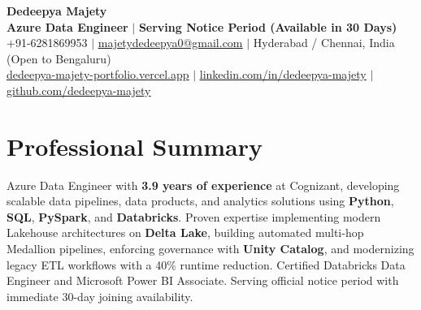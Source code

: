 \documentclass[letterpaper,10pt]{article}
\begin{document}
\begin{center}
    {\Huge \bfseries \color{primaryAccent} Dedeepya Majety} \\ \vspace{2pt}
    \textbf{Azure Data Engineer} $\vert$ \textbf{Serving Notice Period (Available in 30 Days)} \\ \vspace{2pt}
    \small +91-6281869953 $\vert$ \href{mailto:majetydedeepya0@gmail.com}{\underline{majetydedeepya0@gmail.com}} $\vert$ Hyderabad / Chennai, India (Open to Bengaluru) \\ \vspace{1.5pt}
    \href{https://dedeepya-majety-portfolio.vercel.app}{\underline{dedeepya-majety-portfolio.vercel.app}} $\vert$ \href{https://linkedin.com/in/dedeepya-majety}{\underline{linkedin.com/in/dedeepya-majety}} $\vert$ \href{https://github.com/dedeepya-majety}{\underline{github.com/dedeepya-majety}}
\end{center}
\vspace{-8pt}

\section{Professional Summary}
\small{
Azure Data Engineer with \textbf{3.9 years of experience} at Cognizant, developing scalable data pipelines, data products, and analytics solutions using \textbf{Python}, \textbf{SQL}, \textbf{PySpark}, and \textbf{Databricks}. Proven expertise implementing modern Lakehouse architectures on \textbf{Delta Lake}, building automated multi-hop Medallion pipelines, enforcing governance with \textbf{Unity Catalog}, and modernizing legacy ETL workflows with a 40\% runtime reduction. Certified Databricks Data Engineer and Microsoft Power BI Associate. Serving official notice period with immediate 30-day joining availability.
}
\vspace{-2pt}

\end{document}
